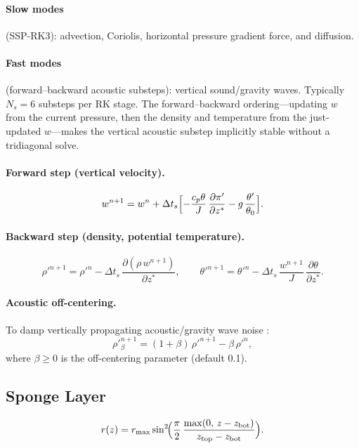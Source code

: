 \documentclass[11pt,twoside]{report}
\newcommand{\pp}{\partial}
\newcommand{\cpd}{c_p}
\begin{document}
\paragraph{Slow modes} (SSP-RK3): advection, Coriolis, horizontal pressure
gradient force, and diffusion.

\paragraph{Fast modes} (forward--backward acoustic substeps):
vertical sound/gravity waves.  Typically $N_s=6$ substeps per RK stage. The
forward--backward ordering---updating $w$ from the current pressure, then the
density and temperature from the just-updated $w$---makes the vertical acoustic
substep implicitly stable without a tridiagonal solve.

\paragraph{Forward step (vertical velocity).}
\begin{equation}
  w^{n+1} = w^n + \Delta t_s
  \Bigl[-\frac{\cpd\theta}{J}\,\frac{\pp\pi'}{\pp z^*}
  - g\,\frac{\theta'}{\theta_0}\Bigr].
\end{equation}

\paragraph{Backward step (density, potential temperature).}
\begin{equation}
  \rho'^{n+1} = \rho'^n
  - \Delta t_s\,\frac{\pp(\rho\,w^{n+1})}{\pp z^*},
  \qquad
  \theta'^{n+1} = \theta'^n
  - \Delta t_s\,\frac{w^{n+1}}{J}\,\frac{\pp\theta}{\pp z^*}.
\end{equation}

\paragraph{Acoustic off-centering.}
To damp vertically propagating acoustic/gravity wave noise
\citep{SkamarockKlemp2008}:
\begin{equation}
  \rho'^{n+1}_{\beta} = (1+\beta)\,\rho'^{n+1} - \beta\,\rho'^{n},
\end{equation}
where $\beta\ge 0$ is the off-centering parameter (default 0.1).

\subsection{Sponge Layer}
\begin{equation}
  r(z) = r_{\max}\sin^2\!\Bigl(\frac{\pi}{2}\,
  \frac{\max(0,\,z-z_{\mathrm{bot}})}{z_{\mathrm{top}}-z_{\mathrm{bot}}}\Bigr).
\end{equation}
\end{document}

